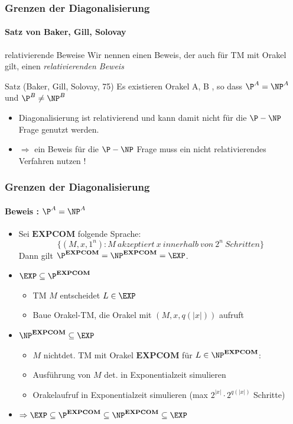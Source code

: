\begin{frame}
	\frametitle{Grenzen der Diagonalisierung}
	\framesubtitle{Satz von Baker, Gill, Solovay}
		\begin{KITinfoblock}{relativierende Beweise}
			Wir nennen einen Beweis, der auch für TM mit Orakel gilt, einen \newline
			\emph{relativierenden Beweis}
		\end{KITinfoblock}
	\bigskip
	\pause
	\begin{KITinfoblock}{Satz (Baker, Gill, Solovay, 75)}
		Es existieren Orakel A, B , so dass ${\P}^A = {\NP}^A$ und ${\P}^B \neq
		{\NP}^B$
	\end{KITinfoblock}
		\pause
		\begin{itemize}[<+->]
		\item Diagonalisierung ist relativierend und kann damit nicht f\"ur die $\P
		- \NP$ Frage genutzt werden.
		\item $\Rightarrow$ ein Beweis für die $\P-\NP$ Frage muss ein nicht
		relativierendes Verfahren nutzen !
		\end{itemize}
		
		
	
\end{frame}



\begin{frame}
	\frametitle{Grenzen der Diagonalisierung}
	\framesubtitle{Beweis : ${\P}^A = {\NP}^A$ }
	\pause
	\begin{itemize} [<+->]
		\item Sei $\mathbf{EXPCOM}$ folgende Sprache: \[\{(M,x,1^n) : M \  akzeptiert \ x \ innerhalb \ von \ 2^n \ Schritten  \}
		 \] 
			Dann gilt ${\P}^{\mathbf{EXPCOM}} = {\NP}^{\mathbf{EXPCOM}} = \EXP$.
			\item $ \EXP \subseteq {\P}^{\mathbf{EXPCOM}} $
			\begin{itemize}
				\item TM $M$ entscheidet $L \in \EXP$
				\item Baue Orakel-TM, die Orakel mit $(M,x,q(|x|))$ aufruft
			\end{itemize}
			\item ${\NP}^{\mathbf{EXPCOM}} \subseteq \EXP$
			\begin{itemize}
				\item  $M$  nichtdet. TM mit Orakel $\mathbf{EXPCOM}$ für $L \in {\NP}^{\mathbf{EXPCOM}}$: 
				\item Ausführung von $M$ det. in Exponentialzeit simulieren
				\item Orakelaufruf in Exponentialzeit simulieren (max $2^{|x|} \cdot 2^{q(|x|)}$ Schritte)	
			\end{itemize}
			
			
			\item $\Rightarrow \EXP \subseteq{\P}^{\mathbf{EXPCOM}} \subseteq {\NP}^{\mathbf{EXPCOM}} \subseteq \EXP$ 
			
	\end{itemize}
\end{frame}

